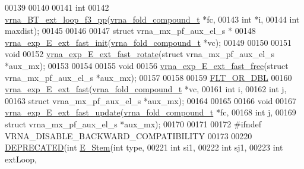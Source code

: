 \begin{DoxyCode}
00139 
00140 
00141 \textcolor{keywordtype}{int}
00142 \mbox{\hyperlink{group__loops_gaf5360c7f7f85f5d557592a3336bef945}{vrna\_BT\_ext\_loop\_f3\_pp}}(\mbox{\hyperlink{group__fold__compound_structvrna__fc__s}{vrna\_fold\_compound\_t}} *fc,
00143                        \textcolor{keywordtype}{int}                  *i,
00144                        \textcolor{keywordtype}{int}                  maxdist);
00145 
00146 
00147 \textcolor{keyword}{struct }vrna\_mx\_pf\_aux\_el\_s *
00148 \mbox{\hyperlink{group__loops_ga3da479a5c627d50530d81f028c181731}{vrna\_exp\_E\_ext\_fast\_init}}(\mbox{\hyperlink{group__fold__compound_structvrna__fc__s}{vrna\_fold\_compound\_t}} *vc);
00149 
00150 
00151 \textcolor{keywordtype}{void}
00152 \mbox{\hyperlink{group__loops_gabe4ed7e3d6152a3b9db4e4ed762aa1ba}{vrna\_exp\_E\_ext\_fast\_rotate}}(\textcolor{keyword}{struct} vrna\_mx\_pf\_aux\_el\_s *aux\_mx);
00153 
00154 
00155 \textcolor{keywordtype}{void}
00156 \mbox{\hyperlink{group__loops_ga4357b7937f1b840f063e44b859332f98}{vrna\_exp\_E\_ext\_fast\_free}}(\textcolor{keyword}{struct} vrna\_mx\_pf\_aux\_el\_s *aux\_mx);
00157 
00158 
00159 \mbox{\hyperlink{group__data__structures_ga31125aeace516926bf7f251f759b6126}{FLT\_OR\_DBL}}
00160 \mbox{\hyperlink{group__loops_ga1c40acdc5e007f72d37a404127e9bcfb}{vrna\_exp\_E\_ext\_fast}}(\mbox{\hyperlink{group__fold__compound_structvrna__fc__s}{vrna\_fold\_compound\_t}}        *vc,
00161                     \textcolor{keywordtype}{int}                         i,
00162                     \textcolor{keywordtype}{int}                         j,
00163                     \textcolor{keyword}{struct} vrna\_mx\_pf\_aux\_el\_s  *aux\_mx);
00164 
00165 
00166 \textcolor{keywordtype}{void}
00167 \mbox{\hyperlink{group__loops_gaceb115e3d8855129797620b3b26882d5}{vrna\_exp\_E\_ext\_fast\_update}}(\mbox{\hyperlink{group__fold__compound_structvrna__fc__s}{vrna\_fold\_compound\_t}}       *fc,
00168                            \textcolor{keywordtype}{int}                        j,
00169                            \textcolor{keyword}{struct} vrna\_mx\_pf\_aux\_el\_s *aux\_mx);
00170 
00171 
00172 \textcolor{preprocessor}{#ifndef VRNA\_DISABLE\_BACKWARD\_COMPATIBILITY}
00173 
00220 \mbox{\hyperlink{exterior__loops_8h_aab347a3c03fbe8e7319551b9fa0cce4a}{DEPRECATED}}(\textcolor{keywordtype}{int} \mbox{\hyperlink{group__loops_ga51f9851f3500c2aae66674142a6a2dd5}{E\_Stem}}(\textcolor{keywordtype}{int}           type,
00221                       \textcolor{keywordtype}{int}           si1,
00222                       \textcolor{keywordtype}{int}           sj1,
00223                       \textcolor{keywordtype}{int}           extLoop,

\end{DoxyCode}
